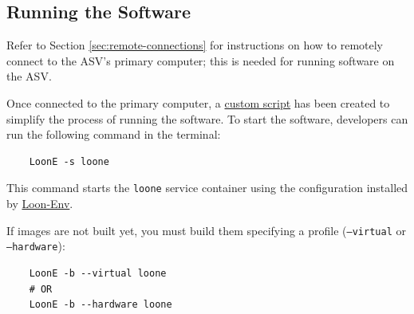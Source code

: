 %
%
%
%

\subsection{Running the Software}
    
Refer to Section \ref{sec:remote-connections} for instructions on how to remotely connect to the ASV's primary computer; this is needed for running software on the ASV.

Once connected to the primary computer, a \href{https://github.com/HumberASV/Loon-Env}{custom script} has been created to simplify the process of running the software.
To start the software, developers can run the following command in the terminal:

\begin{verbatim}
    LoonE -s loone
\end{verbatim}
This command starts the \texttt{loone} service container using the configuration installed by \href{https://github.com/HumberASV/Loon-Env}{Loon-Env}. 

If images are not built yet, you must build them specifying a profile (\texttt{--virtual} or \texttt{--hardware}):

\begin{verbatim}
    LoonE -b --virtual loone
    # OR
    LoonE -b --hardware loone
\end{verbatim}

